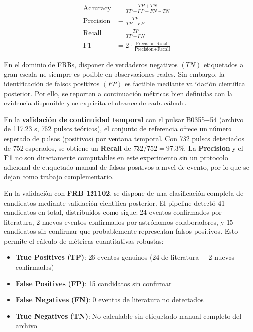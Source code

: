 \begin{align}
\text{Accuracy} &= \frac{TP + TN}{TP + FP + FN + TN} \\
\text{Precision} &= \frac{TP}{TP + FP} \\
\text{Recall} &= \frac{TP}{TP + FN} \\
\text{F1} &= 2\cdot\frac{\text{Precision}\cdot\text{Recall}}{\text{Precision}+\text{Recall}}
\end{align}

En el dominio de FRBs, disponer de verdaderos negativos \((TN)\) etiquetados a gran escala no siempre es posible en observaciones reales. Sin embargo, la identificación de falsos positivos \((FP)\) es factible mediante validación científica posterior. Por ello, se reportan a continuación métricas bien definidas con la evidencia disponible y se explicita el alcance de cada cálculo.

En la \textbf{validación de continuidad temporal} con el pulsar B0355+54 (archivo de 117.23 s, 752 pulsos teóricos), el conjunto de referencia ofrece un número esperado de pulsos (positivos) por ventana temporal. Con 732 pulsos detectados de 752 esperados, se obtiene un \textbf{Recall} de \(732/752 = 97.3\%\). La \textbf{Precision} y el \textbf{F1} no son directamente computables en este experimento sin un protocolo adicional de etiquetado manual de falsos positivos a nivel de evento, por lo que se dejan como trabajo complementario.

En la validación con \textbf{FRB 121102}, se dispone de una clasificación completa de candidatos mediante validación científica posterior. El pipeline detectó 41 candidatos en total, distribuidos como sigue: 24 eventos confirmados por literatura, 2 nuevos eventos confirmados por astrónomos colaboradores, y 15 candidatos sin confirmar que probablemente representan falsos positivos. Esto permite el cálculo de métricas cuantitativas robustas:

\begin{itemize}
    \item \textbf{True Positives (TP)}: 26 eventos genuinos (24 de literatura + 2 nuevos confirmados)
    \item \textbf{False Positives (FP)}: 15 candidatos sin confirmar
    \item \textbf{False Negatives (FN)}: 0 eventos de literatura no detectados
    \item \textbf{True Negatives (TN)}: No calculable sin etiquetado manual completo del archivo
\end{itemize}

